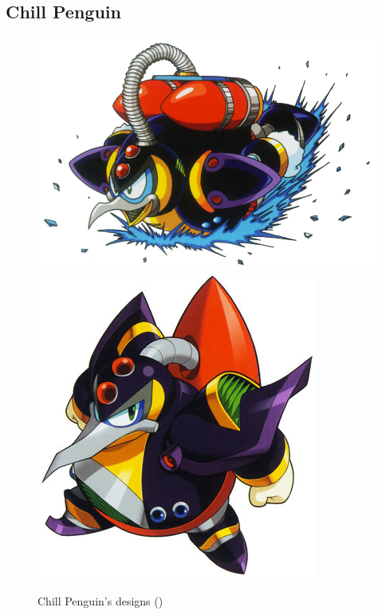 \subsection{Chill Penguin}\label{boss:Chill_Penguin}
\begin{figure}[htp]
	\centering
	\includegraphics[width=0.5\linewidth]{figures/X1/Chill_penguin/Chill_Penguin.jpg}
	\includegraphics[width=0.4\linewidth]{figures/X1/Chill_penguin/MHXChillPenguin.jpg}
	\caption{Chill Penguin's designs (\cite{book:MMX_Complete_art})}
\end{figure}

